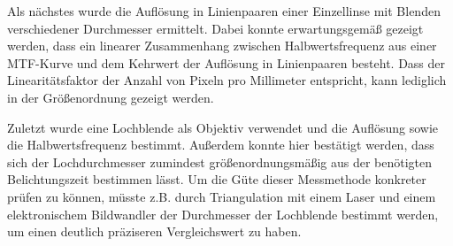 \documentclass[
	a4paper,
	12pt,
	pagesize,
	ngerman
]{scrartcl}
\begin{document}
	Als nächstes wurde die Auflösung in Linienpaaren einer Einzellinse mit Blenden verschiedener Durchmesser ermittelt.
	Dabei konnte erwartungsgemäß gezeigt werden, dass ein linearer Zusammenhang zwischen Halbwertsfrequenz aus einer MTF-Kurve und dem Kehrwert der Auflösung in Linienpaaren besteht.
	Dass der Linearitätsfaktor der Anzahl von Pixeln pro Millimeter entspricht, kann lediglich in der Größenordnung gezeigt werden.
	
	Zuletzt wurde eine Lochblende als Objektiv verwendet und die Auflösung sowie die Halbwertsfrequenz bestimmt.
	Außerdem konnte hier bestätigt werden, dass sich der Lochdurchmesser zumindest größenordnungsmäßig aus der benötigten Belichtungszeit bestimmen lässt.
	Um die Güte dieser Messmethode konkreter prüfen zu können, müsste z.B. durch Triangulation mit einem Laser und einem elektronischem Bildwandler der Durchmesser der Lochblende bestimmt werden, um einen deutlich präziseren Vergleichswert zu haben.
	
	\printbibliography
\end{document}

